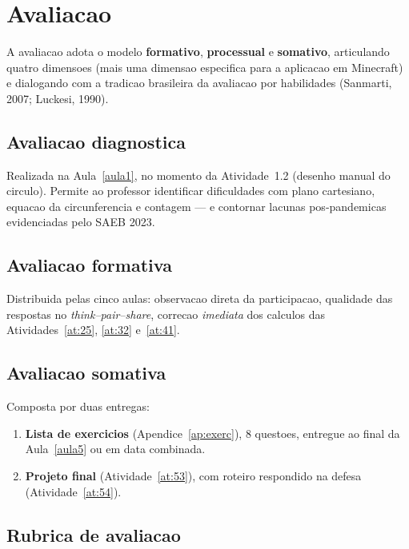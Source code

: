 \documentclass[12pt,a4paper]{scrartcl}
\newcommand{\acc}[1]{\textcolor{accent}{\textbf{#1}}}
\begin{document}
\section{Avaliacao}\label{sec:avaliacao}

A avaliacao adota o modelo \acc{formativo}, \acc{processual} e \acc{somativo}, articulando quatro dimensoes (mais uma dimensao especifica para a aplicacao em Minecraft) e dialogando com a tradicao brasileira da avaliacao por habilidades (Sanmarti, 2007; Luckesi, 1990).

\subsection{Avaliacao diagnostica}
Realizada na Aula~\ref{aula1}, no momento da Atividade~1.2 (desenho manual do circulo). Permite ao professor identificar dificuldades com plano cartesiano, equacao da circunferencia e contagem --- e contornar lacunas pos-pandemicas evidenciadas pelo SAEB 2023.

\subsection{Avaliacao formativa}
Distribuida pelas cinco aulas: observacao direta da participacao, qualidade das respostas no \emph{think--pair--share}, correcao \emph{imediata} dos calculos das Atividades~\ref{at:25}, \ref{at:32} e~\ref{at:41}.

\subsection{Avaliacao somativa}
Composta por duas entregas:

\begin{enumerate}[leftmargin=1.5em,itemsep=0.2em,topsep=0.3em,nosep]
  \item \textbf{Lista de exercicios} (Apendice~\ref{ap:exerc}), 8 questoes, entregue ao final da Aula~\ref{aula5} ou em data combinada.
  \item \textbf{Projeto final} (Atividade~\ref{at:53}), com roteiro respondido na defesa (Atividade~\ref{at:54}).
\end{enumerate}

\subsection{Rubrica de avaliacao}
\end{document}
